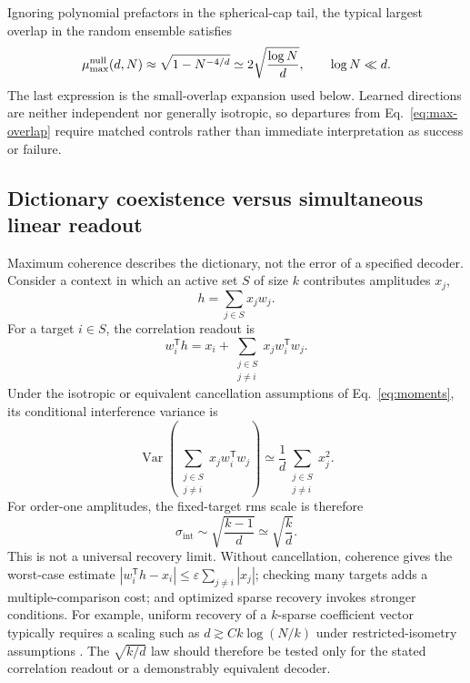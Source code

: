 \documentclass[
  aps,
  reprint,
  superscriptaddress,
  floatfix,
  nofootinbib,
  longbibliography
]{revtex4-2}
\newcommand{\Nsem}{N}
\newcommand{\sint}{\sigma_{\mathrm{int}}}
\newcommand{\T}{^{\mathsf{T}}}
\DeclareMathOperator{\Var}{Var}
\begin{document}
Ignoring polynomial prefactors in the spherical-cap tail, the typical largest
overlap in the random ensemble satisfies
%
\begin{equation}
\label{eq:max-overlap}
\mu_{\max}^{\rm null}(d,\Nsem)
\approx \sqrt{1-\Nsem^{-4/d}}
\simeq 2\sqrt{\frac{\log\Nsem}{d}},
\qquad \log\Nsem\ll d.
\end{equation}
%
The last expression is the small-overlap expansion used below.  Learned
directions are neither independent nor generally isotropic, so departures
from Eq.~\eqref{eq:max-overlap} require matched controls rather than immediate
interpretation as success or failure.

\subsection{Dictionary coexistence versus simultaneous linear readout}
\label{sec:dictionary-readout}

Maximum coherence describes the dictionary, not the error of a specified
decoder.  Consider a context in which an active set $S$ of size $k$ contributes
amplitudes $x_j$,
%
\begin{equation}
\label{eq:hidden}
h=\sum_{j\in S}x_j w_j .
\end{equation}
%
For a target $i\in S$, the correlation readout is
%
\begin{equation}
\label{eq:readout}
w_i\T h
=x_i+
\sum_{\substack{j\in S\\j\ne i}}x_j w_i\T w_j.
\end{equation}
%
Under the isotropic or equivalent cancellation assumptions of
Eq.~\eqref{eq:moments}, its conditional interference variance is
%
\begin{equation}
\label{eq:intvar}
\Var\!\left(
\sum_{\substack{j\in S\\j\ne i}}x_j w_i\T w_j
\right)
\simeq \frac{1}{d}
\sum_{\substack{j\in S\\j\ne i}}x_j^2 .
\end{equation}
%
For order-one amplitudes, the fixed-target rms scale is therefore
%
\begin{equation}
\label{eq:sint}
\sint\sim\sqrt{\frac{k-1}{d}}\simeq\sqrt{\frac{k}{d}}.
\end{equation}
%
This is not a universal recovery limit.  Without cancellation, coherence gives
the worst-case estimate
$|w_i\T h-x_i|\le\varepsilon\sum_{j\ne i}|x_j|$; checking many targets adds a
multiple-comparison cost; and optimized sparse recovery invokes stronger
conditions.  For example, uniform recovery of a $k$-sparse coefficient vector
typically requires a scaling such as
$d\gtrsim Ck\log(\Nsem/k)$ under restricted-isometry assumptions
\cite{donoho2006compressed,candes2006robust,foucart2013mathematical}.  The
$\sqrt{k/d}$ law should therefore be tested only for the stated correlation
readout or a demonstrably equivalent decoder.
\end{document}

